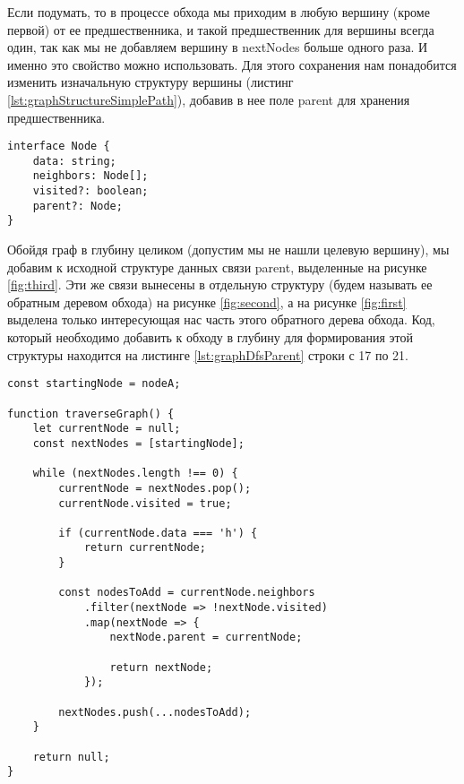 \documentclass[../article.tex]{subfiles}
\begin{document}
Если подумать, то в процессе обхода мы приходим в любую вершину (кроме первой) от ее предшественника, и такой предшественник для вершины всегда один, так как мы не добавляем вершину в {\firacodebold nextNodes} больше одного раза. И именно это свойство можно использовать. Для этого сохранения нам понадобится изменить изначальную структуру вершины (листинг \ref{lst:graphStructureSimplePath}), добавив в нее поле {\firacodebold parent} для хранения предшественника.

\begin{ruledelement}
    \begin{lstlisting}[caption={Структура вершины графа для поиска пути}, label={lst:graphStructureSimplePath}]
interface Node {
    data: string;
    neighbors: Node[];
    visited?: boolean;
    parent?: Node;
}
    \end{lstlisting}
\end{ruledelement}

Обойдя граф в глубину целиком (допустим мы не нашли целевую вершину), мы добавим к исходной структуре данных связи parent, выделенные на рисунке \ref{fig:third}. Эти же связи вынесены в отдельную структуру (будем называть ее обратным деревом обхода) на рисунке \ref{fig:second}, а на рисунке \ref{fig:first} выделена только интересующая нас часть этого обратного дерева обхода. Код, который необходимо добавить к обходу в глубину для формирования этой структуры находится на листинге \ref{lst:graphDfsParent} строки с 17 по 21.

\begin{figure*}
    \begin{ruledelement}
        \begin{lstlisting}[caption={Обход графа в глубину и формирование обратного дерева обхода}, label={lst:graphDfsParent}]
const startingNode = nodeA;

function traverseGraph() {
    let currentNode = null;
    const nextNodes = [startingNode];

    while (nextNodes.length !== 0) {
        currentNode = nextNodes.pop();
        currentNode.visited = true;

        if (currentNode.data === 'h') {
            return currentNode;
        }

        const nodesToAdd = currentNode.neighbors
            .filter(nextNode => !nextNode.visited)
            .map(nextNode => {
                nextNode.parent = currentNode;

                return nextNode;
            });

        nextNodes.push(...nodesToAdd);
    }

    return null;
}
        \end{lstlisting}
    \end{ruledelement}

\end{figure*}
\end{document}
